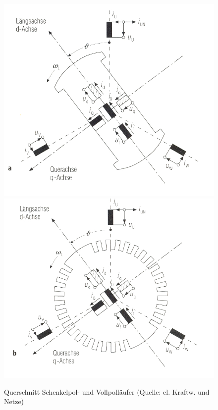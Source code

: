 \documentclass{scrartcl}
\begin{document}
\begin{onehalfspace}
	\begin{figure}[H]
	\centering
	\includegraphics[scale=0.85]{img/schenkelpol.jpg}
	\includegraphics[scale=0.85]{img/vollpol.jpg}
	\caption{Querschnitt Schenkelpol- und Vollpolläufer (Quelle: el. Kraftw. und Netze)}
	\end{figure}



\end{onehalfspace}
\end{document}
